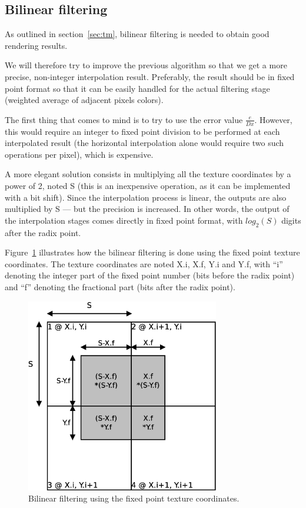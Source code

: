 \documentclass[a4paper,11pt]{kthesis}
\begin{document}
\subsection{Bilinear filtering}
\label{subsec:bilfpformat}
As outlined in section~\ref{sec:tm}, bilinear filtering is needed to obtain good rendering results.

We will therefore try to improve the previous algorithm so that we get a more precise, non-integer interpolation result. Preferably, the result should be in fixed point format so that it can be easily handled for the actual filtering stage (weighted average of adjacent pixels colors).

The first thing that comes to mind is to try to use the error value $\frac{e}{Dx}$. However, this would require an integer to fixed point division to be performed at each interpolated result (the horizontal interpolation alone would require two such operations per pixel), which is expensive.

A more elegant solution consists in multiplying all the texture coordinates by a power of 2, noted S (this is an inexpensive operation, as it can be implemented with a bit shift). Since the interpolation process is linear, the outputs are also multiplied by S --- but the precision is increased. In other words, the output of the interpolation stages comes directly in fixed point format, with $log_{2}(S)$ digits after the radix point.

Figure~\ref{fig:filtfromfp} illustrates how the bilinear filtering is done using the fixed point texture coordinates. The texture coordinates are noted X.i, X.f, Y.i and Y.f, with ``i'' denoting the integer part of the fixed point number (bits before the radix point) and ``f'' denoting the fractional part (bits after the radix point).

\begin{figure}[htp]
\centering
\includegraphics[height=85mm]{filtfromfp.eps}
\caption{Bilinear filtering using the fixed point texture coordinates.}
\label{fig:filtfromfp}
\end{figure}
\end{document}
